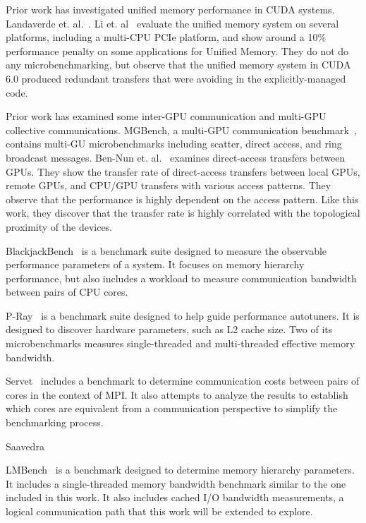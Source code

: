 Prior work has investigated unified memory performance in CUDA systems.
Landaverde et. al.~\cite{landaverde2014investigation}.
Li et. al~\cite{li2015evaluation} evaluate the unified memory system on several platforms, including a multi-CPU PCIe platform, and show around a 10\% performance penalty on some applications for Unified Memory.
They do not do any microbenchmarking, but observe that the unified memory system in CUDA 6.0 produced redundant transfers that were avoiding in the explicitly-managed code.

Prior work has examined some inter-GPU communication and multi-GPU collective communications.
MGBench, a multi-GPU communication benchmark~\cite{bennun2016mgbench}, contains multi-GU microbenchmarks including scatter, direct access, and ring broadcast messages.
Ben-Nun et. al.~\cite{ben2017groute} examines direct-access transfers between GPUs.
They show the transfer rate of direct-access transfers between local GPUs, remote GPUs, and CPU/GPU transfers with various access patterns.
They observe that the performance is highly dependent on the access pattern.
Like this work, they discover that the transfer rate is highly correlated with the topological proximity of the devices.

BlackjackBench~\cite{danalis2012blackjackbench} is a benchmark suite designed to measure the observable performance parameters of a system.
It focuses on memory hierarchy performance, but also includes a workload to measure communication bandwidth between pairs of CPU cores.

P-Ray~\cite{duchateau2008p} is a benchmark suite designed to help guide performance autotuners.
It is designed to discover hardware parameters, such as L2 cache size.
Two of its microbenchmarks measures single-threaded and multi-threaded effective memory bandwidth.

Servet~\cite{gonzalez2010servet} includes a benchmark to determine communication costs between pairs of cores in the context of MPI.
It also attempts to analyze the results to establish which cores are equivalent from a communication perspective to simplify the benchmarking process.

Saavedra

LMBench~\cite{mcvoy1996lmbench} is a benchmark designed to determine memory hierarchy parameters.
It includes a single-threaded memory bandwidth benchmark similar to the one included in this work.
It also includes cached I/O bandwidth measurements, a logical communication path that this work will be extended to explore.

